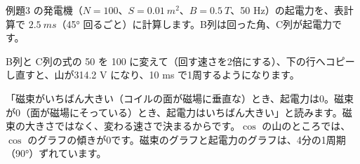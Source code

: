 例題3 の発電機（$N=100$、$S=\qty{0.01}{m^2}$、$B=\qty{0.5}{T}$、50 Hz）の起電力を、表計算で $\qty{2.5}{ms}$（45° 回るごと）に計算します。B列は回った角、C列が起電力です。
\begin{bkcenter}
\label{ph:電-8:tab-sheet}
\end{bkcenter}
B列と C列の式の 50 を 100 に変えて（回す速さを2倍にする）、下の行へコピーし直すと、山が314.2 V になり、10 ms で1周するようになります。

\begin{phyomi}[$\mathcal E=NBS\omega\sin\omega t$]
「磁束がいちばん大きい（コイルの面が磁場に垂直な）とき、起電力は0。磁束が0（面が磁場にそっている）とき、起電力はいちばん大きい」と読みます。磁束の大きさではなく、変わる速さで決まるからです。$\cos$ の山のところでは、$\cos$ のグラフの傾きが0です。磁束のグラフと起電力のグラフは、4分の1周期（90°）ずれています。
\end{phyomi}

